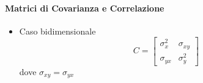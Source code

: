 \documentclass{article}
\begin{document}
        \paragraph{}
        
         \paragraph{Matrici di Covarianza e Correlazione} 
         \begin{itemize}
             \item Caso bidimensionale $$C = \left[
             \begin{matrix}
                \sigma^2_x &\sigma_{xy} \\
                \sigma_{yx}& \sigma^2_y
             \end{matrix}
             \right]$$
             dove $\sigma_{xy} = \sigma_{yx}$
             

\end{itemize}
\end{document}
